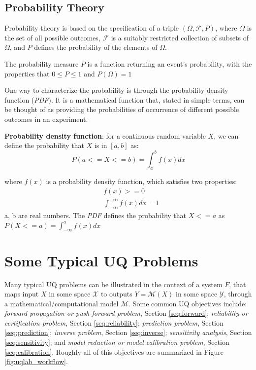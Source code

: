 \subsection{Probability Theory}
Probability theory is based on the specification of a triple $(\Omega,\mathcal{F},P)$, where $\Omega$ is the set of all possible outcomes, $\mathcal{F}$  is a suitably restricted collection of subsets of $\Omega$, and $P$ defines the probability of the elements of $\Omega$.

The probability measure $P$ is a function returning an event's probability, with the properties that $0 \leq P \leq 1$ and $P(\Omega)=1$

One way to characterize the probability is through the probability density function (\textit{PDF}). It is a mathematical function that, stated in simple terms, can be thought of as providing the probabilities of occurrence of different possible outcomes in an experiment. 

\textbf{Probability density function}: for a continuous random variable $X$, we can define the probability that $X$ is in $[a,b]$ as:
\begin{equation}
P(a<=X<=b)=\int_a^b f(x)dx
\end{equation}

where $f(x)$ is a probability density function, which satisfies two properties:
\begin{equation*}
\begin{aligned}
& f(x)>=0 \\ 
& \int_{-\infty}^{+\infty}f(x) dx =1
\end{aligned}
\end{equation*}
a, b are real numbers.
The \textit{PDF} defines the probability that $X<=a$ as
$P(X<=a)=\int_{-\infty}^a f(x) dx$

\section{Some Typical UQ Problems}\label{sec:uq_problems}
Many typical UQ problems can be illustrated in the context of a system $F$, that maps input $X$ in some space $\mathcal{X}$ to outputs $Y = \mathcal{M}(X)$ in some space $\mathcal{Y}$, through a mathematical/computational model $\mathcal{M}$. Some common UQ objectives include: \textit{forward propagation or push-forward problem}, Section \ref{seq:forward}; \textit{reliability or certification problem}, Section \ref{seq:reliability}; \textit{prediction problem}, Section \ref{seq:prediction}; \textit{inverse problem}, Section \ref{seq:inverse}; \textit{sensitivity analysis}, Section \ref{seq:sensitivity}; and \textit{model reduction or model calibration problem}, Section \ref{seq:calibration}. Roughly all of this objectives are summarized in Figure \ref{fig:uqlab_workflow}.

